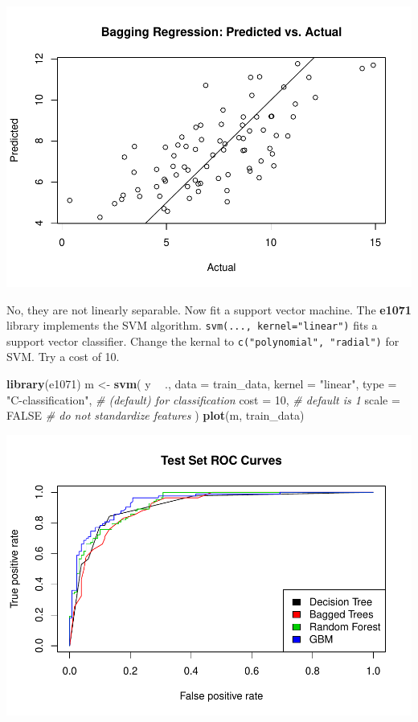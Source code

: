 \documentclass[]{book}
\newenvironment{Shaded}{\begin{snugshade}}{\end{snugshade}}
\newcommand{\CommentTok}[1]{\textcolor[rgb]{0.56,0.35,0.01}{\textit{#1}}}
\newcommand{\DataTypeTok}[1]{\textcolor[rgb]{0.13,0.29,0.53}{#1}}
\newcommand{\DecValTok}[1]{\textcolor[rgb]{0.00,0.00,0.81}{#1}}
\newcommand{\KeywordTok}[1]{\textcolor[rgb]{0.13,0.29,0.53}{\textbf{#1}}}
\newcommand{\NormalTok}[1]{#1}
\newcommand{\OperatorTok}[1]{\textcolor[rgb]{0.81,0.36,0.00}{\textbf{#1}}}
\newcommand{\OtherTok}[1]{\textcolor[rgb]{0.56,0.35,0.01}{#1}}
\newcommand{\StringTok}[1]{\textcolor[rgb]{0.31,0.60,0.02}{#1}}
\begin{document}
\includegraphics{data-sci_files/figure-latex/unnamed-chunk-92-1.pdf}

No, they are not linearly separable. Now fit a support vector machine. The \textbf{e1071} library implements the SVM algorithm. \texttt{svm(...,\ kernel="linear")} fits a support vector classifier. Change the kernal to \texttt{c("polynomial",\ "radial")} for SVM. Try a cost of 10.

\begin{Shaded}
\begin{Highlighting}[]
\KeywordTok{library}\NormalTok{(e1071)}
\NormalTok{m <-}\StringTok{ }\KeywordTok{svm}\NormalTok{(}
\NormalTok{  y }\OperatorTok{~}\StringTok{ }\NormalTok{., }
  \DataTypeTok{data =}\NormalTok{ train_data,}
  \DataTypeTok{kernel =} \StringTok{"linear"}\NormalTok{,}
  \DataTypeTok{type =} \StringTok{"C-classification"}\NormalTok{,  }\CommentTok{# (default) for classification}
  \DataTypeTok{cost =} \DecValTok{10}\NormalTok{,  }\CommentTok{# default is 1}
  \DataTypeTok{scale =} \OtherTok{FALSE}  \CommentTok{# do not standardize features}
\NormalTok{)}
\KeywordTok{plot}\NormalTok{(m, train_data)}
\end{Highlighting}
\end{Shaded}

\includegraphics{data-sci_files/figure-latex/unnamed-chunk-93-1.pdf}
\end{document}
